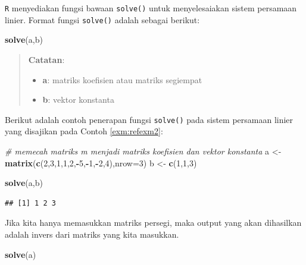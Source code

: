 \documentclass[
]{book}
\newenvironment{Shaded}{\begin{snugshade}}{\end{snugshade}}
\newcommand{\AttributeTok}[1]{\textcolor[rgb]{0.13,0.29,0.53}{#1}}
\newcommand{\CommentTok}[1]{\textcolor[rgb]{0.56,0.35,0.01}{\textit{#1}}}
\newcommand{\DecValTok}[1]{\textcolor[rgb]{0.00,0.00,0.81}{#1}}
\newcommand{\FunctionTok}[1]{\textcolor[rgb]{0.13,0.29,0.53}{\textbf{#1}}}
\newcommand{\NormalTok}[1]{#1}
\newcommand{\OtherTok}[1]{\textcolor[rgb]{0.56,0.35,0.01}{#1}}
\newcommand{\SpecialCharTok}[1]{\textcolor[rgb]{0.81,0.36,0.00}{\textbf{#1}}}
\providecommand{\tightlist}{%
  \setlength{\itemsep}{0pt}\setlength{\parskip}{0pt}}
\theoremstyle{definition}
\theoremstyle{definition}
\theoremstyle{definition}
\theoremstyle{definition}
\theoremstyle{remark}
\begin{document}
\texttt{R} menyediakan fungsi bawaan \texttt{solve()} untuk menyelesaiakan sistem persamaan linier. Format fungsi \texttt{solve()} adalah sebagai berikut:

\begin{Shaded}
\begin{Highlighting}[]
\FunctionTok{solve}\NormalTok{(a,b)}
\end{Highlighting}
\end{Shaded}

\begin{quote}
\textbf{Catatan}:

\begin{itemize}
\tightlist
\item
  \textbf{a}: matriks koefisien atau matriks segiempat
\item
  \textbf{b}: vektor konstanta
\end{itemize}
\end{quote}

Berikut adalah contoh penerapan fungsi \texttt{solve()} pada sistem persamaan linier yang disajikan pada Contoh \ref{exm:refexm2}:

\begin{Shaded}
\begin{Highlighting}[]
\CommentTok{\# memecah matriks m menjadi matriks koefisien dan vektor konstanta}
\NormalTok{a }\OtherTok{\textless{}{-}} \FunctionTok{matrix}\NormalTok{(}\FunctionTok{c}\NormalTok{(}\DecValTok{2}\NormalTok{,}\DecValTok{3}\NormalTok{,}\DecValTok{1}\NormalTok{,}\DecValTok{1}\NormalTok{,}\DecValTok{2}\NormalTok{,}\SpecialCharTok{{-}}\DecValTok{5}\NormalTok{,}\SpecialCharTok{{-}}\DecValTok{1}\NormalTok{,}\SpecialCharTok{{-}}\DecValTok{2}\NormalTok{,}\DecValTok{4}\NormalTok{),}\AttributeTok{nrow=}\DecValTok{3}\NormalTok{)}
\NormalTok{b }\OtherTok{\textless{}{-}} \FunctionTok{c}\NormalTok{(}\DecValTok{1}\NormalTok{,}\DecValTok{1}\NormalTok{,}\DecValTok{3}\NormalTok{)}

\FunctionTok{solve}\NormalTok{(a,b)}
\end{Highlighting}
\end{Shaded}

\begin{verbatim}
## [1] 1 2 3
\end{verbatim}

Jika kita hanya memasukkan matriks persegi, maka output yang akan dihasilkan adalah invers dari matriks yang kita masukkan.

\begin{Shaded}
\begin{Highlighting}[]
\FunctionTok{solve}\NormalTok{(a)}
\end{Highlighting}
\end{Shaded}
\end{document}
